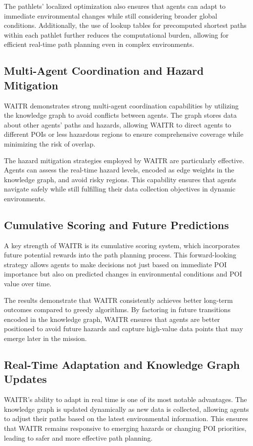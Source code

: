 \documentclass[conference]{IEEEtran}
\begin{document}
The pathlets' localized optimization also ensures that agents can adapt to immediate environmental changes while still considering broader global conditions. Additionally, the use of lookup tables for precomputed shortest paths within each pathlet further reduces the computational burden, allowing for efficient real-time path planning even in complex environments.

\subsection{Multi-Agent Coordination and Hazard Mitigation}
WAITR demonstrates strong multi-agent coordination capabilities by utilizing the knowledge graph to avoid conflicts between agents. The graph stores data about other agents' paths and hazards, allowing WAITR to direct agents to different POIs or less hazardous regions to ensure comprehensive coverage while minimizing the risk of overlap.

The hazard mitigation strategies employed by WAITR are particularly effective. Agents can assess the real-time hazard levels, encoded as edge weights in the knowledge graph, and avoid risky regions. This capability ensures that agents navigate safely while still fulfilling their data collection objectives in dynamic environments.

\subsection{Cumulative Scoring and Future Predictions}
A key strength of WAITR is its cumulative scoring system, which incorporates future potential rewards into the path planning process. This forward-looking strategy allows agents to make decisions not just based on immediate POI importance but also on predicted changes in environmental conditions and POI value over time.

The results demonstrate that WAITR consistently achieves better long-term outcomes compared to greedy algorithms. By factoring in future transitions encoded in the knowledge graph, WAITR ensures that agents are better positioned to avoid future hazards and capture high-value data points that may emerge later in the mission.

\subsection{Real-Time Adaptation and Knowledge Graph Updates}
WAITR's ability to adapt in real time is one of its most notable advantages. The knowledge graph is updated dynamically as new data is collected, allowing agents to adjust their paths based on the latest environmental information. This ensures that WAITR remains responsive to emerging hazards or changing POI priorities, leading to safer and more effective path planning.
\end{document}
